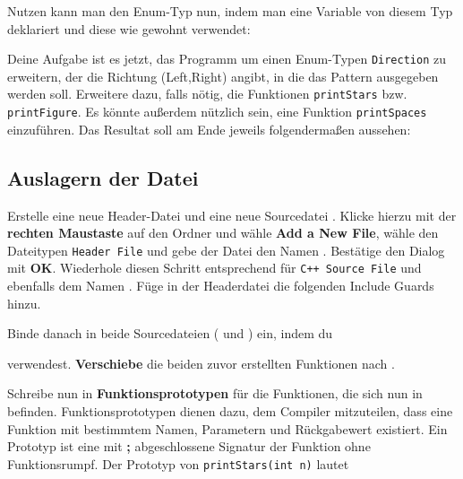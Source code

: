 
Nutzen kann man den Enum-Typ nun, indem man eine Variable von diesem Typ deklariert und diese wie gewohnt verwendet:


Deine Aufgabe ist es jetzt, das Programm um einen Enum-Typen \lstinline{Direction} zu erweitern, der die Richtung (Left,Right) angibt, in die das Pattern ausgegeben werden soll. Erweitere dazu, falls nötig, die Funktionen \lstinline{printStars} bzw. \lstinline{printFigure}. Es könnte außerdem nützlich sein, eine Funktion \lstinline{printSpaces} einzuführen.
Das Resultat soll am Ende jeweils folgendermaßen aussehen:


\subsection{Auslagern der Datei}
Erstelle eine neue Header-Datei \textbf{} und eine neue
Sourcedatei \textbf{}.
Klicke hierzu mit der \textbf{rechten Maustaste} auf den Ordner \textbf{} und wähle \textbf{Add a New File}, wähle den Dateitypen \texttt{Header File} und gebe der Datei den Namen . 
Bestätige den Dialog mit \textbf{OK}.
Wiederhole diesen Schritt entsprechend für \texttt{C++ Source File} und ebenfalls dem Namen .
Füge in der Headerdatei die folgenden Include Guards hinzu.


Binde danach  in beide Sourcedateien ( und ) ein, indem du


verwendest.
\textbf{Verschiebe} die beiden zuvor erstellten Funktionen nach .

Schreibe nun in  \textbf{Funktionsprototypen} für die Funktionen, die sich nun in  befinden.
Funktionsprototypen dienen dazu, dem Compiler mitzuteilen, dass eine Funktion mit bestimmtem Namen, Parametern und Rückgabewert existiert.
Ein Prototyp ist eine mit \textbf{;} abgeschlossene Signatur der Funktion ohne Funktionsrumpf.
Der Prototyp von \lstinline{printStars(int n)} lautet 

